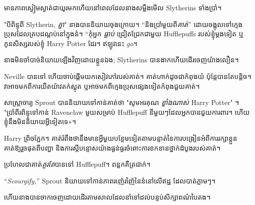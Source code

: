 មាន​ភាព​ស្ងៀមស្ងាត់​ជា​យូរ​មក​ហើយ​នៅ​ពេល​ដែល​នាង​សម្លឹង​មើល Slytherins ទាំង​ប្រាំ។

"បីពិន្ទុពី Slytherin, \emph{គ្នា}" នាងបាននិយាយចុងក្រោយ។ “និងប្រាំមួយពី\emph{គាត់}” ដោយចង្អុលទៅក្មេងប្រុសដែលគ្របដណ្តប់នៅក្នុងនំ។ “កុំអ្នក \emph{ធ្លាប់} ជ្រៀតជ្រែកជាមួយ Hufflepuffs របស់ខ្ញុំម្តងទៀត ឬកូនសិស្សរបស់ខ្ញុំ Harry Potter ដែរ។ ឥឡូវនេះ \emph{go}។

នាងមិនចាំបាច់និយាយឡើងវិញដោយខ្លួនឯង; Slytherins បានងាកហើយដើរចេញយ៉ាងលឿន។

Neville បានទៅ ហើយចាប់ផ្តើមយកសៀវភៅរបស់គាត់។ គាត់​ហាក់​ដូច​ជា​កំពុង​យំ ប៉ុន្តែ​បាន​តែ​បន្តិច។ វាអាចមកពីការយឺតយ៉ាវតក់ស្លុត ឬអាចមកពីក្មេងប្រុសផ្សេងទៀតកំពុងជួយគាត់។

សាស្ត្រាចារ្យ Sprout បាននិយាយទៅកាន់គាត់ថា "សូមអរគុណ \emph{{} ខ្លាំងណាស់} Harry Potter" ។ "ប្រាំពីរពិន្ទុទៅកាន់ Ravenclaw មួយសម្រាប់ Hufflepuff នីមួយៗដែលអ្នកបានជួយការពារ។ ហើយ​ខ្ញុំ​នឹង​មិន​និយាយ​អ្វី​ទៀត​ទេ»។

Harry ព្រិចភ្នែក។ គាត់រំពឹងថានឹងមានអ្វីមួយបន្ថែមទៀតតាមបន្ទាត់នៃការបង្រៀនអំពីការរក្សាខ្លួនគាត់ឱ្យរួចផុតពីបញ្ហា និងការស្តីបន្ទោសយ៉ាងធ្ងន់ធ្ងរចំពោះការខកខានថ្នាក់ដំបូងរបស់គាត់។

ប្រហែលជាគាត់\emph{គួរតែ}បានទៅ Hufflepuff។ ពន្លកគឺត្រជាក់។

“\emph{Scourgify,}” Sprout និយាយទៅកាន់ភាពរញ៉េរញ៉ៃនៃនំនៅលើឥដ្ឋ ដែលបាត់ភ្លាមៗ។

ហើយនាងបានចាកចេញដោយដើរតាមសាលដែលនាំទៅដល់បន្ទប់សិក្សាពណ៌បៃតង។

